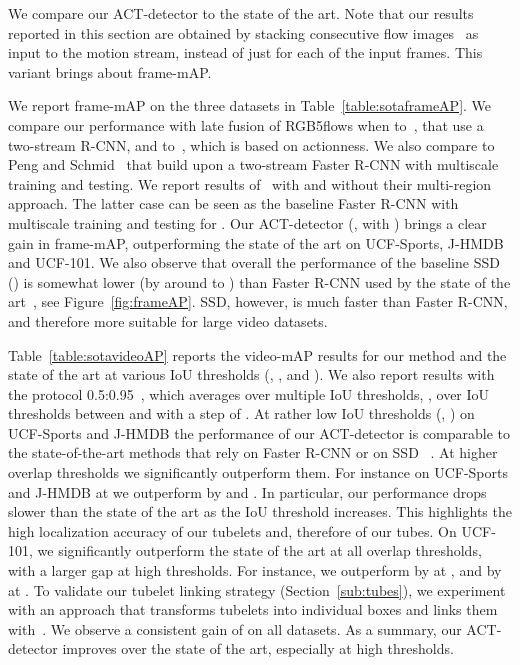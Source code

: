\documentclass[10pt,twocolumn,letterpaper]{article}
\begin{document}
We compare our ACT-detector to the state of the art. Note that our results reported in this section are obtained by stacking  consecutive flow images~\cite{Peng16eccv,Simonyan2014nips} as input to the motion stream, instead of just  for each of the  input frames. This variant brings about  frame-mAP. 

\vspace{-0.2mm}
We report frame-mAP on the three datasets in Table~\ref{table:sotaframeAP}. We compare our performance with late fusion of RGB5flows when  to~\cite{Gkioxari15cvpr,Weinzaepfel15iccv}, that use a two-stream R-CNN, and to~\cite{wang16cvpr}, which is based on actionness. We also compare to Peng and Schmid~\cite{Peng16eccv} that build upon a two-stream Faster R-CNN with multiscale training and testing. We report results of~\cite{Peng16eccv} with and without their multi-region approach. The latter case can be seen as the baseline Faster R-CNN with multiscale training and testing for . Our ACT-detector (\ie, with ) brings a clear gain in frame-mAP, outperforming the state of the art on UCF-Sports, J-HMDB and UCF-101.
We also observe that overall the performance of the baseline SSD () is somewhat lower (by around  to ) than Faster R-CNN used by the state of the art~\cite{Peng16eccv}, see Figure~\ref{fig:frameAP}. SSD, however, is much faster than Faster R-CNN, and therefore more suitable for large video datasets.

\vspace{-0.2mm}
Table~\ref{table:sotavideoAP} reports the video-mAP results for our method and the state of the art at various IoU thresholds (, , and ). We also report results with the protocol 0.5:0.95~\cite{coco}, which averages over multiple IoU thresholds, \ie, over  IoU thresholds between  and  with a step of . 
At rather low IoU thresholds (, ) on UCF-Sports and J-HMDB the performance of our ACT-detector is comparable to the state-of-the-art methods that rely on Faster R-CNN \cite{Peng16eccv,Suman16bmvc} or on SSD ~\cite{singh16arxiv}. 
At higher overlap thresholds we significantly outperform them. 
For instance on UCF-Sports and J-HMDB at  we outperform \cite{Peng16eccv} by  and . 
In particular, our performance drops slower than the state of the art as the IoU threshold increases.  This highlights the high localization accuracy of our tubelets and, therefore of our tubes. On UCF-101, we significantly outperform the state of the art at all overlap thresholds, with a larger gap at high thresholds. 
For instance, we outperform \cite{singh16arxiv} by  at , and by  at . 
To validate our tubelet linking strategy (Section~\ref{sub:tubes}), we experiment with an approach that transforms tubelets into individual boxes and links them with~\cite{Peng16eccv,Suman16bmvc}. 
We observe a consistent gain of  on all datasets. 
As a summary, our ACT-detector improves over the state of the art, especially at high thresholds.
\end{document}
